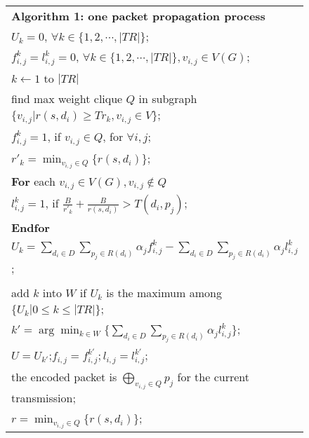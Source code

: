 \documentclass[journal]{IEEEtran}
\begin{document}
\begin{figure}[t]\center
\scriptsize{
\begin{tabular}{|l|}
\hline {\bf Algorithm 1: one packet propagation process}\\
\hspace{2mm} $U_k=0$, $\forall k\in \{1,2,\cdots,|TR|\}$;\\
\hspace{2mm} $f^k_{i,j}=l^k_{i,j}=0$, $\forall k\in \{1,2,\cdots,|TR|\},v_{i,j}\in V(G)$;\\
\hspace{2mm}{\bf for} $k\longleftarrow 1$ to $|TR|$\\
\hspace{4mm} find max weight clique $Q$ in subgraph $\{v_{i,j}|r(s,d_i)\geq Tr_k, v_{i,j}\in V\}$;\\
\hspace{4mm} $f^k_{i,j}=1$, if $v_{i,j}\in Q$, for $\forall i,j$;\\
\hspace{4mm} $r'_k=\min_{v_{i,j}\in Q}\{r(s,d_i)\}$;\\
\hspace{4mm} {\bf For} each $v_{i,j}\in V(G),v_{i,j}\notin Q$\\
\hspace{6mm} $l^k_{i,j}=1$, if $\frac{B}{r'_k}+\frac{B}{r(s,d_i)}>T(d_i,p_j)$;\\
\hspace{4mm} {\bf Endfor}\\
\hspace{4mm} $U_k=\sum_{d_i\in D}\sum_{p_j\in R(d_i)} \alpha_j f^k_{i,j}- \sum_{d_i\in D}\sum_{p_j\in R(d_i)}\alpha_j l^k_{i,j}$;\\
\hspace{2mm}{\bf Endfor}\\
\hspace{2mm} add $k$ into $W$ if $U_k$ is the maximum among $\{U_k|0\leq k\leq |TR|\}$;\\
\hspace{2mm} $k'=\arg\min_{k\in W}\{\sum_{d_i\in D}\sum_{p_j\in R(d_i)}\alpha_j l^k_{i,j}\}$;\\
\hspace{2mm} $U=U_{k'}$;$f_{i,j}=f^{k'}_{i,j};l_{i,j}=l^{k'}_{i,j}$;\\
\hspace{2mm} the encoded packet is $\bigoplus_{v_{i,j}\in Q}p_j$ for the current transmission;\\
\hspace{2mm} $r=\min_{v_{i,j}\in Q}\{r(s,d_i)\}$;\\

\end{tabular}}
\end{figure}
\end{document}
